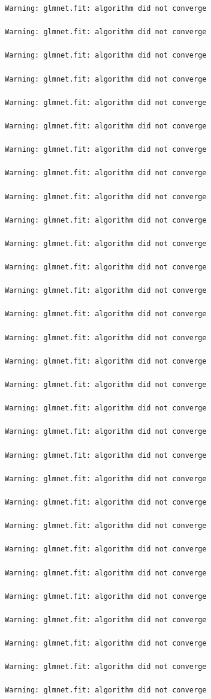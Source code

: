 \documentclass[
  article]{jss}
\begin{document}
\begin{verbatim}
Warning: glmnet.fit: algorithm did not converge

Warning: glmnet.fit: algorithm did not converge

Warning: glmnet.fit: algorithm did not converge

Warning: glmnet.fit: algorithm did not converge

Warning: glmnet.fit: algorithm did not converge

Warning: glmnet.fit: algorithm did not converge

Warning: glmnet.fit: algorithm did not converge

Warning: glmnet.fit: algorithm did not converge

Warning: glmnet.fit: algorithm did not converge

Warning: glmnet.fit: algorithm did not converge

Warning: glmnet.fit: algorithm did not converge

Warning: glmnet.fit: algorithm did not converge

Warning: glmnet.fit: algorithm did not converge

Warning: glmnet.fit: algorithm did not converge

Warning: glmnet.fit: algorithm did not converge

Warning: glmnet.fit: algorithm did not converge

Warning: glmnet.fit: algorithm did not converge

Warning: glmnet.fit: algorithm did not converge

Warning: glmnet.fit: algorithm did not converge

Warning: glmnet.fit: algorithm did not converge

Warning: glmnet.fit: algorithm did not converge

Warning: glmnet.fit: algorithm did not converge

Warning: glmnet.fit: algorithm did not converge

Warning: glmnet.fit: algorithm did not converge

Warning: glmnet.fit: algorithm did not converge

Warning: glmnet.fit: algorithm did not converge

Warning: glmnet.fit: algorithm did not converge

Warning: glmnet.fit: algorithm did not converge

Warning: glmnet.fit: algorithm did not converge

Warning: glmnet.fit: algorithm did not converge


\end{verbatim}
\end{document}

